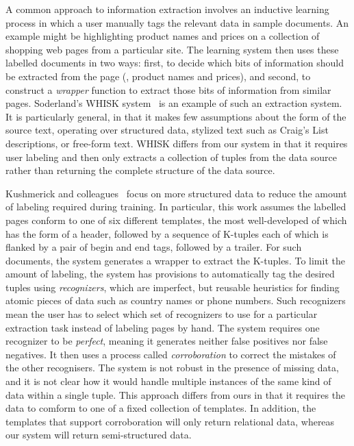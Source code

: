 A common approach to information extraction involves an inductive
learning process in which a user manually tags the relevant data in sample documents.
An example might be highlighting product names and prices on a
collection of shopping web pages from a particular site.  The learning
system then uses these labelled documents in two ways: first, to
decide which bits of information should be extracted from the page
(\ie, product names and prices), and second, to construct a
\textit{wrapper} function to extract those bits of information from
similar pages.  Soderland's WHISK system~\cite{soderland:whisk} is an
example of such an extraction system.  It is particularly general, in
that it makes few assumptions about the form of the source text,
operating over structured data, stylized text such as Craig's List
descriptions, or free-form text.  WHISK differs from our system in
that it requires user labeling and then only extracts a collection of
tuples from the data source rather than returning the complete
structure of the data source.


Kushmerick and
colleagues~\cite{kushmerick-phd1997,KushmerickWD97:Wrapper} focus on
more structured data to reduce the amount of labeling required during
training.  In particular, this work assumes the labelled pages conform
to one of six different templates, the most well-developed of which
has the form of a header, followed by a sequence of K-tuples each of
which is flanked by a pair of begin and end tags, followed by a
trailer.  For such documents, the system generates a wrapper to
extract the K-tuples.  To limit the amount of labeling, the system
has provisions to automatically tag the desired tuples using {\it
recognizers}, which are imperfect, but reusable heuristics for finding
atomic pieces of data such as country names or phone numbers.  Such
recognizers mean the user has to select which set of recognizers to
use for a particular extraction task instead of labeling pages by
hand.  The system requires one recognizer to be {\it perfect}, meaning
it generates neither false positives nor false negatives.  It then
uses a process called {\it corroboration} to correct the mistakes of
the other recognisers.  The system is not robust in the presence of
missing data, and it is not clear how it would handle multiple
instances of the same kind of data within a single tuple. This
approach differs from ours in that it requires the data to comform to
one of a fixed collection of templates.  In addition, the 
templates that support corroboration will only return relational data,
whereas our system will return semi-structured data.


